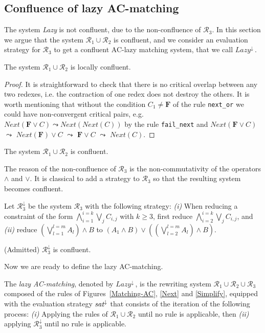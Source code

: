 \documentclass[submission,copyright,creativecommons]{eptcs}
\newcommand \lazy{$\textit{Lazy}^{\downarrow}\,$}
\numberwithin{subcase}{case}
\begin{document}
\subsection{Confluence of lazy AC-matching}
\label{confluence:sec}
The system \textit{Lazy} is not confluent, due to the non-confluence of
$\mathcal{R}_3$. In this section we argue that the system $\mathcal{R}_1\cup
\mathcal{R}_2$ is confluent, and we consider an evaluation strategy
for $\mathcal{R}_3$ to  get a confluent AC-lazy matching system, that we call \lazy.

\begin{proposition}
The system $\mathcal{R}_1 \cup \mathcal{R}_2$ is locally confluent.
\end{proposition}
\begin{proof}
It is straightforward to check that there is no critical  overlap between 
 any two redexes, i.e. the contraction of one redex does not destroy the others. 
It is worth mentioning that without the  condition $C_1\neq \textbf{F}$ 
  of the rule \texttt{next\_or} 
we could have non-convergent critical pairs, e.g.
$Next(\textbf{F} \lor C)\leadsto Next(Next(C))$ by the rule 
\texttt{fail\_next} and  
$Next(\textbf{F} \lor C)$ $\leadsto$ $Next(\textbf{F}) \lor C$ 
$\leadsto$ $\textbf{F}\lor C$ $\leadsto$ $Next(C)$.
\end{proof}

\begin{corollary}
The system $\mathcal{R}_1\cup \mathcal{R}_2$
is confluent. 
\end{corollary}

 The reason of the non-confluence of 
$\mathcal{R}_3$  is the non-commutativity 
of the operators $\land$ and $\lor$.
It is classical to add a strategy to $\mathcal{R}_3$
so that the resulting system becomes confluent.
\begin{definition}
Let $\mathcal{R}_3^{\downarrow}$  be the system $\mathcal{R}_3$ 
 with the following strategy: 
\textit{(i)} When reducing a constraint of the 
form $\bigwedge_{i=1}^{i=k} \bigvee_j C_{i,j}$ with $k\ge 3$, first reduce
 $\bigwedge_{i=2}^{i=k} \bigvee_j C_{i,j}$, and 
\textit{(ii)}  reduce 
$(\bigvee_{l=1}^{l=m} A_l) \land B$  to 
$(A_1 \land B) \lor ((\bigvee_{l=2}^{l=m} A_l) \land B)$.
\end{definition}
\begin{proposition}(Admitted)
$\mathcal{R}_3^{\downarrow}$ is  confluent.
\end{proposition}
Now we are ready to define the lazy AC-matching.
\begin{definition}
\label{ac:conf:lazy:def}
The \emph{lazy AC-matching}, denoted by \lazy, is the
rewriting system $\mathcal{R}_1\cup \mathcal{R}_2 \cup \mathcal{R}_3$ composed of the 
 rules of Figures~\ref{Matching-AC}, \ref{Next} and
 \ref{Simplify}, equipped with the evaluation strategy $\emph{sat}^{\downarrow}$ 
that consists of the iteration of the following process:
\emph{(i)} Applying the rules of $\mathcal{R}_1\cup \mathcal{R}_2$ until no
rule is applicable, then \emph{(ii)} applying  $\mathcal{R}_3^{\downarrow}$ 
until no rule  is applicable.
\end{definition}
\end{document}
